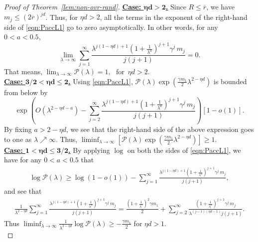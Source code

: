 \documentclass[11pt]{article}
\newcommand{\rbdd}{\overline{r}}
\newcommand{\lt}{\left}
\newcommand{\rt}{\right}
\newcommand{\pno}{\mathcal{P}(\lambda)}
\begin{document}
\begin{appendices}
\begin{proof}[Proof of Theorem~\ref{lem:non-ovr-rand}]
\noindent
{\bf \underline{Case: $\boldsymbol{\eta d > 2}$.}} Since $R \leq \rbdd$,
we have $m_j \leq (2\rbdd)^{jd}$. Thus, for $\eta d > 2$, all the terms in the exponent of the right-hand side of \eqref{eqn:PaccL1} go to zero asymptotically. In other words, for any $0 < a < 0.5$,
\[
 \lim_{\lambda \rightarrow \infty } \sum_{j = 1}^\infty \frac{\lambda^{j(1 - \eta d)+1} \lt(1+ \frac{1}{\lambda^{a}}\rt)^{j+1}\gamma^j\, m_j}{j(j+1)} = 0.
\]
That means, $ \lim_{\lambda \rightarrow \infty} \pno = 1,\,\, \text{ for }\, \eta d > 2.$\\

\noindent
{\bf \underline{Case: $\boldsymbol{3/2 < \eta d \leq 2}$.}}
Using \eqref{eqn:PaccL1}, $\pno \exp\lt( \frac{\gamma m_1}{2}\lambda^{2 - \eta d} \rt)$ is bounded from below by 
\[
\exp\left(  O\lt(\lambda^{2 - \eta d - a}\rt) - \sum_{j = 2}^\infty \frac{\lambda^{j(1 - \eta d)+1} \lt(1+ \frac{1}{\lambda^{a}}\rt)^{j+1}\gamma^j\, m_j}{j(j+1)}\right)\lt[ 1 - o(1) \rt].
\]
By fixing $a > 2 - \eta d$, we see that the right-hand side of the above expression goes to one as $\lambda \nearrow \infty$. Thus,
$\liminf_{\lambda \rightarrow \infty } \lt[\pno \exp\lt( \frac{\gamma m_1}{2}\lambda^{2 - \eta d} \rt)\rt] \geq 1.$\\

\noindent
{\bf \underline{Case: $\boldsymbol{1 < \eta d \leq 3/2}$.}} By applying $\log$ on both the sides of \eqref{eqn:PaccL1}, we have for any $0 < a < 0.5$ that
\begin{align*}
 \log\pno \geq \log \lt(1 - o(1) \rt) - \sum_{j = 1}^\infty \frac{\lambda^{j(1 - \eta d)+1} \lt(1+ \frac{1}{\lambda^{a}}\rt)^{j+1}\gamma^j\, m_j}{j(j+1)},
\end{align*}
and see that
\begin{align*}
 \frac{1}{\lambda^{2 - \eta d}}\sum_{j = 1}^\infty \frac{\lambda^{j(1 - \eta d)+1} \lt(1+ \frac{1}{\lambda^{a}}\rt)^{j+1}\gamma^j\, m_j}{j(j+1)} = \frac{\lt(1 + \frac{1}{\lambda^\epsilon} \rt)^2 \gamma m_1}{2} + \sum_{j = 2}^\infty \frac{\lt(1+ \frac{1}{\lambda^{a}}\rt)^{j+1}\gamma^j\, m_j}{\lambda^{(j-1)(\eta d -1 )} j(j+1)}.
\end{align*}
Thus $\liminf_{\lambda\rightarrow \infty} \frac{1}{\lambda^{2 - \eta d}} \log\pno \geq - \frac{\gamma m_1}{2}$
for $\eta d > 1$.\\


\end{proof}
\end{appendices}
\end{document}
